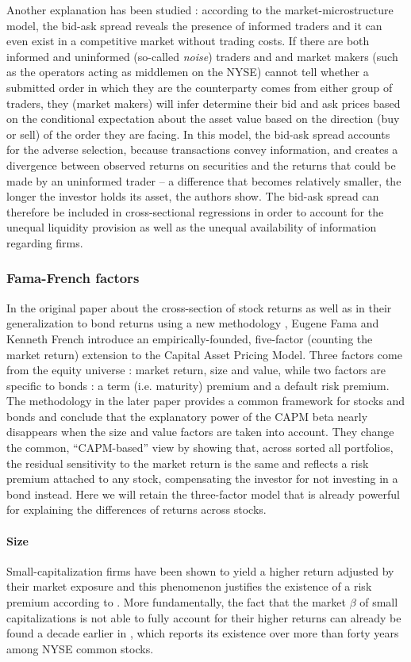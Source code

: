 Another explanation has been studied : according to the \textcite{Glosten1985} market-microstructure model, the bid-ask spread reveals the presence of informed traders and it can even exist in a competitive market without trading costs. If there are both informed and uninformed (so-called \emph{noise}) traders and and market makers (such as the operators acting as middlemen on the NYSE) cannot tell whether a submitted order in which they are the counterparty comes from either group of traders, they (market makers) will infer determine their bid and ask prices based on the conditional expectation about the asset value based on the direction (buy or sell) of the order they are facing. In this model, the bid-ask spread accounts for the adverse selection, because transactions convey information, and creates a divergence between observed returns on securities and the returns that could be made by an uninformed trader -- a difference that becomes relatively smaller, the longer the investor holds its asset, the authors show. The bid-ask spread can therefore be included in cross-sectional regressions in order to account for the unequal liquidity provision as well as the unequal availability of information regarding firms.
\subsubsection{Fama-French factors}
In the original paper about the cross-section of stock returns \parencite{Fama1992} as well as in their generalization to bond returns using a new methodology \parencite{Fama1993}, Eugene Fama and Kenneth French introduce an empirically-founded, five-factor (counting the market return) extension to the Capital Asset Pricing Model. Three factors come from the equity universe : market return, size and value, while two factors are specific to bonds : a term (i.e. maturity) premium and a default risk premium. The methodology in the later paper provides a common framework for stocks and bonds and conclude that the explanatory power of the CAPM beta nearly disappears when the size and value factors are taken into account. They change the common, ``CAPM-based'' view by showing that, across sorted all portfolios, the residual sensitivity to the market return is the same and reflects a risk premium attached to any stock, compensating the investor for not investing in a bond instead. Here we will retain the three-factor model that is already powerful for explaining the differences of returns across stocks.
\paragraph{Size}
Small-capitalization firms have been shown to yield a higher return adjusted by their market exposure and this phenomenon justifies the existence of a risk premium according to \textcite{Fama1992}. More fundamentally, the fact that the market $\beta$ of small capitalizations is not able to fully account for their higher returns can already be found a decade earlier in \textcite{Banz1981}, which reports its existence over more than forty years among NYSE common stocks.

